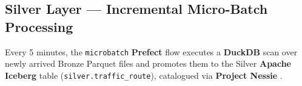   \subsection{Silver Layer — Incremental Micro-Batch Processing}                                                                                          
  \label{subsec:silver}                                                                                                                                   
                                                                                                                                                          
  Every 5 minutes, the \texttt{microbatch} \textbf{Prefect}                                                                                               
  \cite{prefect_docs} flow executes a \textbf{DuckDB} \cite{duckdb_paper}
  scan over newly arrived Bronze Parquet files and promotes them to the                                                                                   
  Silver \textbf{Apache Iceberg} \cite{iceberg_paper} table                                                                                               
  (\texttt{silver.traffic\_route}), catalogued via \textbf{Project Nessie}                                                                                
  \cite{nessie_docs}.                                                                                                                                     
                                                                                                                                                          
